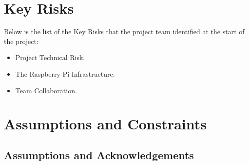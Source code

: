 \documentclass[12pt]{article} %
\begin{document}
		
	
	
	
	
	
	
	
	

	
\section{Key Risks}

Below is the list of the Key Risks that the project team identified at the start of the project:\\

\begin{itemize}
	\item Project Technical Risk.
	\item The Raspberry Pi Infrastructure.
	\item Team Collaboration.
\end{itemize}
	
	\section{Assumptions and Constraints}
	
\subsection{Assumptions and Acknowledgements}
\end{document}
